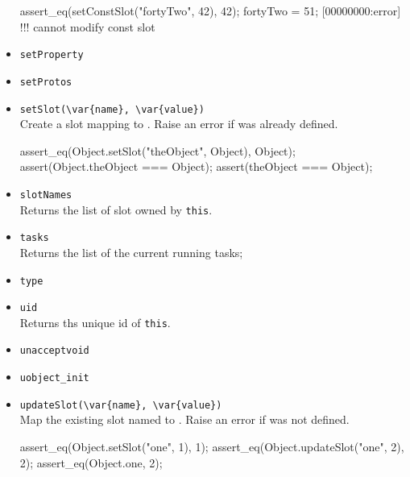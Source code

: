 \begin{itemize}
\begin{urbiscript}[firstnumber=last]
assert_eq(setConstSlot("fortyTwo", 42), 42);
fortyTwo = 51;
[00000000:error] !!! cannot modify const slot
\end{urbiscript}

\item \lstinline|setProperty|\\

\item \lstinline|setProtos|\\

\item \lstinline|setSlot(\var{name}, \var{value})|\\
  Create a slot  mapping to . Raise an error if
   was already defined.

\begin{urbiscript}[firstnumber=last]
assert_eq(Object.setSlot("theObject", Object), Object);
assert(Object.theObject === Object);
assert(theObject === Object);
\end{urbiscript}

\item \lstinline|slotNames|\\
  Returns the list of slot owned by \lstinline|this|.

\item \lstinline|tasks|\\
  Returns the list of the current running tasks;

\item \lstinline|type|\\

\item \lstinline|uid|\\
  Returns ths unique id of \lstinline|this|.

\item \lstinline|unacceptvoid|\\

\item \lstinline|uobject_init|\\

\item \lstinline|updateSlot(\var{name}, \var{value})|\\
  Map the existing slot named  to . Raise an
  error if  was not defined.
\begin{urbiscript}[firstnumber=last]
assert_eq(Object.setSlot("one", 1), 1);
assert_eq(Object.updateSlot("one", 2), 2);
assert_eq(Object.one, 2);
\end{urbiscript}


\end{itemize}
